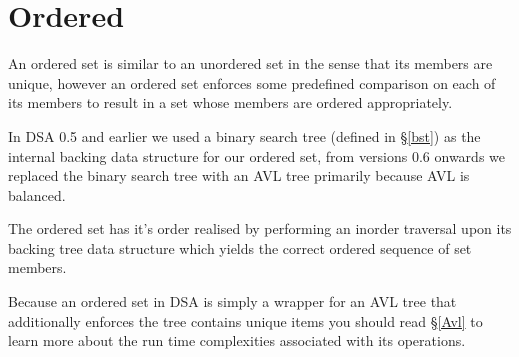 \section{Ordered}
An ordered set is similar to an unordered set in the sense that its members are unique, however an ordered set enforces some predefined comparison on each of its members to result in a set whose members are ordered appropriately.

In DSA 0.5 and earlier we used a binary search tree (defined in \S\ref{bst}) as the internal backing data structure for our ordered set, from versions 0.6 onwards we replaced the binary search tree with an AVL tree primarily because AVL is balanced.

The ordered set has it's order realised by performing an inorder traversal upon its backing tree data structure which yields the correct ordered sequence of set members.

Because an ordered set in DSA is simply a wrapper for an AVL tree that additionally enforces the tree contains unique items you should read \S\ref{Avl} to learn more about the run time complexities associated with its operations.
